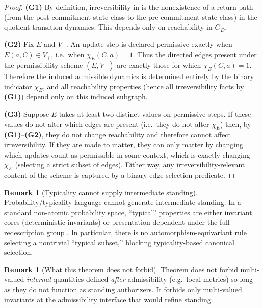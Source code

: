 \documentclass[11pt]{article}
\theoremstyle{definition}
\newtheorem{remark}[theorem]{Remark}
\begin{document}
\begin{proof}
\textbf{(G1)} By definition, irreversibility in  is the nonexistence of a return path
(from the post-commitment state class to the pre-commitment state class) in the quotient transition dynamics.
This depends only on reachability in $G_D$.

\textbf{(G2)} Fix $E$ and $V_+$.
An update step is declared permissive exactly when $E(a,C)\in V_+$, i.e.\ when $\chi_E(C,a)=1$.
Thus the directed edges present under the permissibility scheme $(E,V_+)$ are exactly those for which $\chi_E(C,a)=1$.
Therefore the induced admissible dynamics is determined entirely by the binary indicator $\chi_E$, and all reachability
properties (hence all irreversibility facts by \textbf{(G1)}) depend only on this induced subgraph.

\textbf{(G3)} Suppose $E$ takes at least two distinct values on permissive steps.
If these values do not alter which edges are present (i.e.\ they do not alter $\chi_E$) then, by \textbf{(G1)}--\textbf{(G2)},
they do not change reachability and therefore cannot affect irreversibility.
If they are made to matter, they can only matter by changing which updates count as permissible in some context, which is
exactly changing $\chi_E$ (selecting a strict subset of edges).
Either way, any irreversibility-relevant content of the scheme is captured by a binary edge-selection predicate.
\end{proof}

\begin{remark}[Typicality cannot supply intermediate standing]
\label{rem:typicality}
Probability/typicality language cannot generate intermediate standing.
In a standard non-atomic probability space, ``typical'' properties are either invariant cores (deterministic invariants) or
presentation-dependent under the full redescription group \cite{MaleyTypicalityCollapse2026}.
In particular, there is no automorphism-equivariant rule selecting a nontrivial ``typical subset,'' blocking typicality-based
canonical selection.
\end{remark}


\begin{remark}[What this theorem does not forbid]
Theorem  does not forbid multi-valued \emph{internal} quantities
defined \emph{after} admissibility (e.g.\ local metrics) so long as they do not function as standing
authorizers.
It forbids only multi-valued invariants at the admissibility interface that would refine standing.
\end{remark}
\end{document}
